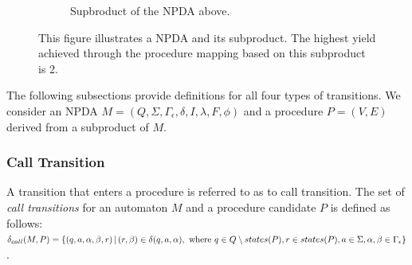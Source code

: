 \begin{figure}[!h]
                \begin{subfigure}[b]{0.485\textwidth}
                    \centering
                    \caption*{Supbroduct of the NPDA above.}
                \end{subfigure}
                \vspace*{1em}
                \caption{This figure illustrates a NPDA and its subproduct. The highest yield achieved through the procedure mapping based on this subproduct is 2.}
                \label{fig:trans_types}
            \end{figure}

            The following subsections provide definitions for all four types of transitions. We consider an NPDA $M = (Q, \Sigma, \Gamma_\epsilon, \delta, I, \lambda, F, \phi)$ and a procedure $P = (V, E)$ derived from a subproduct of $M$.

        \subsubsection*{Call Transition}
            A transition that enters a procedure is referred to as to call transition. The set of \textit{call transitions} for an automaton $M$ and a procedure candidate $P$ is defined as follows: $\delta_{call}(M, P) = \{(q, a, \alpha, \beta, r)\,|\,(r, \beta) \in \delta(q, a, \alpha),\\\textnormal{ where } q \in Q \setminus states(P), r \in states(P), a \in \Sigma, \alpha, \beta \in \Gamma_\epsilon\}$.

